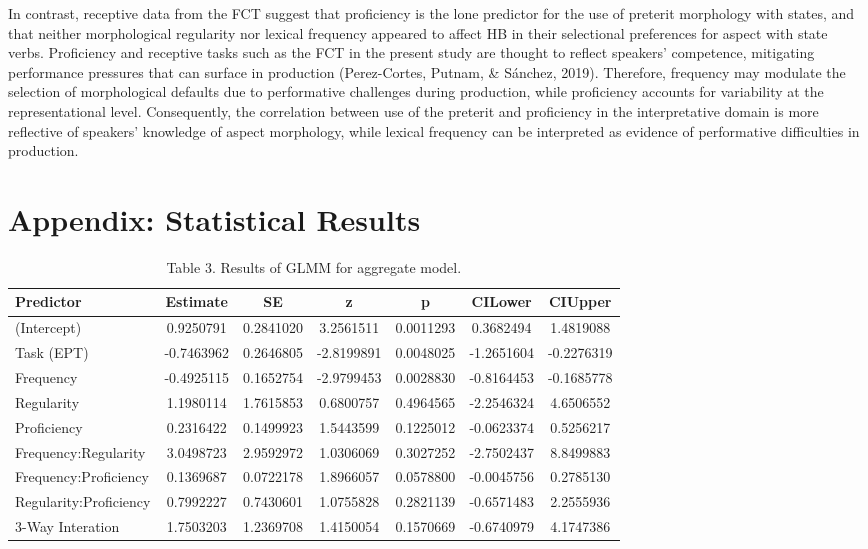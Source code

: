 \documentclass[
  english,
  man,floatsintext]{apa6}
\begin{document}
In contrast, receptive data from the FCT suggest that proficiency is the lone predictor for the use of preterit morphology with states, and that neither morphological regularity nor lexical frequency appeared to affect HB in their selectional preferences for aspect with state verbs. Proficiency and receptive tasks such as the FCT in the present study are thought to reflect speakers' competence, mitigating performance pressures that can surface in production (Perez-Cortes, Putnam, \& Sánchez, 2019). Therefore, frequency may modulate the selection of morphological defaults due to performative challenges during production, while proficiency accounts for variability at the representational level. Consequently, the correlation between use of the preterit and proficiency in the interpretative domain is more reflective of speakers' knowledge of aspect morphology, while lexical frequency can be interpreted as evidence of performative difficulties in production.

\hypertarget{appendix-statistical-results}{%
\section{Appendix: Statistical Results}\label{appendix-statistical-results}}

\begin{table}

\caption{\label{tab:table-for-aggregate}Table 3. Results of GLMM for aggregate model.}
\centering
\begin{tabular}[t]{l|c|c|c|c|c|c}
\hline
Predictor & Estimate & SE & z & p & CILower & CIUpper\\
\hline
(Intercept) & 0.9250791 & 0.2841020 & 3.2561511 & 0.0011293 & 0.3682494 & 1.4819088\\
\hline
Task (EPT) & -0.7463962 & 0.2646805 & -2.8199891 & 0.0048025 & -1.2651604 & -0.2276319\\
\hline
Frequency & -0.4925115 & 0.1652754 & -2.9799453 & 0.0028830 & -0.8164453 & -0.1685778\\
\hline
Regularity & 1.1980114 & 1.7615853 & 0.6800757 & 0.4964565 & -2.2546324 & 4.6506552\\
\hline
Proficiency & 0.2316422 & 0.1499923 & 1.5443599 & 0.1225012 & -0.0623374 & 0.5256217\\
\hline
Frequency:Regularity & 3.0498723 & 2.9592972 & 1.0306069 & 0.3027252 & -2.7502437 & 8.8499883\\
\hline
Frequency:Proficiency & 0.1369687 & 0.0722178 & 1.8966057 & 0.0578800 & -0.0045756 & 0.2785130\\
\hline
Regularity:Proficiency & 0.7992227 & 0.7430601 & 1.0755828 & 0.2821139 & -0.6571483 & 2.2555936\\
\hline
3-Way Interation & 1.7503203 & 1.2369708 & 1.4150054 & 0.1570669 & -0.6740979 & 4.1747386\\
\hline
\end{tabular}
\end{table}
\end{document}
